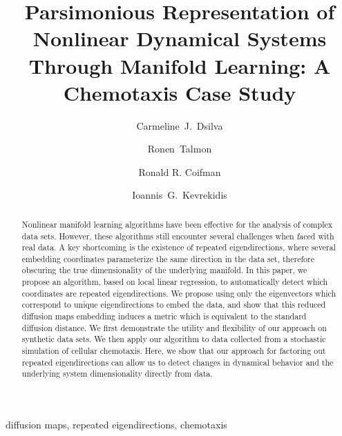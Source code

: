 \documentclass[3p]{elsarticle}
\begin{document}
\begin{frontmatter}

\title{Parsimonious Representation of Nonlinear Dynamical Systems Through Manifold Learning: A Chemotaxis Case Study}

\author[princeton]{Carmeline~J.~Dsilva}
%
\author[technion]{Ronen~Talmon}
%
\author[yale]{Ronald R. Coifman}
%
\author[princeton,princetonpacm]{Ioannis~G.~Kevrekidis }

\address[princeton]{Department of Chemical and Biological Engineering, Princeton University, Princeton, NJ, 08540, USA}
\address[technion]{Technion - Israel Institute of Technology, Haifa, 3200003, Israel}
\address[yale]{Department of Mathematics, Yale University, New Haven, CT, 06520, USA}
\address[princetonpacm]{Program in Applied and Computational Mathematics, Princeton University, Princeton, NJ, 08540, USA}
%


\begin{abstract}
Nonlinear manifold learning algorithms have been effective for the analysis of complex data sets. 
%
However, these algorithms still encounter several challenges when faced with real data.
%
A key shortcoming is the existence of repeated eigendirections, where several embedding coordinates parameterize the same direction in the data set, therefore obscuring the true dimensionality of the underlying manifold. 
%
In this paper, we propose an algorithm, based on local linear regression, to automatically detect which coordinates are repeated eigendirections. 
%
We propose using only the eigenvectors which correspond to unique eigendirections to embed the data, and show that this reduced diffusion maps embedding induces a metric which is equivalent to the standard diffusion distance. 
%
We first demonstrate the utility and flexibility of our approach on synthetic data sets. 
%
We then apply our algorithm to data collected from a stochastic simulation of cellular chemotaxis. 
%
Here, we show that our approach for factoring out repeated eigendirections can allow us to detect changes in dynamical behavior and the underlying system dimensionality directly from data. 
%
\end{abstract}


\begin{keyword}
diffusion maps, repeated eigendirections, chemotaxis
\end{keyword}

\end{frontmatter}
\end{document}
